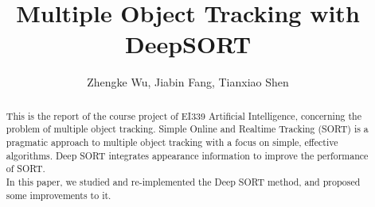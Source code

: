 \documentclass[conference]{IEEEtran}
\begin{document}
%
\title{Multiple Object Tracking with DeepSORT}
%
%
%

\author{
    Zhengke Wu,
    Jiabin Fang,
    Tianxiao Shen
}

%


\maketitle

\begin{abstract}
    This is the report of the course project of EI339 Artificial Intelligence, concerning the problem of multiple object tracking. Simple Online and Realtime Tracking (SORT) is a pragmatic
    approach to multiple object tracking with a focus on simple,
    effective algorithms. Deep SORT integrates appearance information to improve the performance of SORT. \\
    In this paper, we studied and re-implemented the Deep SORT method, and proposed some improvements to it.
\end{abstract}

\end{document}
